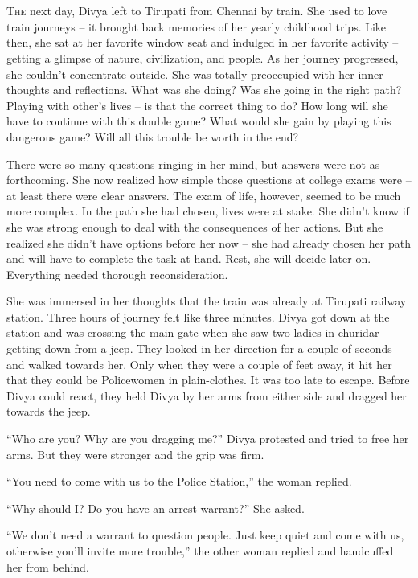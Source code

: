 \chapter{}

\lettrine{T}{he} next day, Divya left to Tirupati from Chennai by train. She used to love
train journeys – it brought back memories of her yearly childhood trips. Like
then, she sat at her favorite window seat and indulged in her favorite activity
– getting a glimpse of nature, civilization, and people. As her journey
progressed, she couldn't concentrate outside. She was totally preoccupied with
her inner thoughts and reflections. What was she doing? Was she going in the
right path? Playing with other's lives – is that the correct thing to do? How
long will she have to continue with this double game? What would she gain by
playing this dangerous game? Will all this trouble be worth in the end?

There were so many questions ringing in her mind, but answers were not as
forthcoming. She now realized how simple those questions at college exams were –
at least there were clear answers. The exam of life, however, seemed to be much
more complex. In the path she had chosen, lives were at stake. She didn't know
if she was strong enough to deal with the consequences of her actions. But she
realized she didn't have options before her now – she had already chosen her
path and will have to complete the task at hand. Rest, she will decide later on.
Everything needed thorough reconsideration.

She was immersed in her thoughts that the train was already at Tirupati railway
station. Three hours of journey felt like three minutes. Divya got down at the
station and was crossing the main gate when she saw two ladies in churidar
getting down from a jeep. They looked in her direction for a couple of seconds
and walked towards her. Only when they were a couple of feet away, it hit her
that they could be Policewomen in plain-clothes. It was too late to escape.
Before Divya could react, they held Divya by her arms from either side and
dragged her towards the jeep.

“Who are you? Why are you dragging me?” Divya protested and tried to free her
arms. But they were stronger and the grip was firm.

“You need to come with us to the Police Station,” the woman replied.

“Why should I? Do you have an arrest warrant?” She asked.

“We don't need a warrant to question people. Just keep quiet and come with us,
otherwise you'll invite more trouble,” the other woman replied and handcuffed
her from behind.

